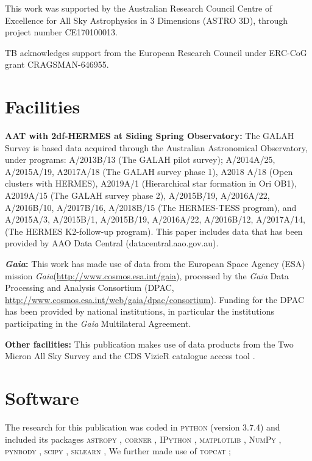 \documentclass[fleqn,usenatbib]{mnras}
\newcommand{\Gaia}{\textit{Gaia}\xspace} %
\begin{document}
This work was supported by the Australian Research Council Centre of Excellence for All Sky Astrophysics in 3 Dimensions (ASTRO 3D), through project number CE170100013.

TB acknowledges support from the European Research Council under ERC-CoG grant CRAGSMAN-646955.

\section*{Facilities}

\textbf{AAT with 2df-HERMES at Siding Spring Observatory:}
The GALAH Survey is based data acquired through the Australian Astronomical Observatory, under programs: A/2013B/13 (The GALAH pilot survey); A/2014A/25, A/2015A/19, A2017A/18 (The GALAH survey phase 1), A2018 A/18 (Open clusters with HERMES), A2019A/1 (Hierarchical star formation in Ori OB1), A2019A/15 (The GALAH survey phase 2), A/2015B/19, A/2016A/22, A/2016B/10, A/2017B/16, A/2018B/15 (The HERMES-TESS program), and A/2015A/3, A/2015B/1, A/2015B/19, A/2016A/22, A/2016B/12, A/2017A/14, (The HERMES K2-follow-up program). This paper includes data that has been provided by AAO Data Central (datacentral.aao.gov.au).

\textbf{\Gaia: } This work has made use of data from the European Space Agency (ESA) mission \Gaia (\url{http://www.cosmos.esa.int/gaia}), processed by the \Gaia Data Processing and Analysis Consortium (DPAC, \url{http://www.cosmos.esa.int/web/gaia/dpac/consortium}). Funding for the DPAC has been provided by national institutions, in particular the institutions participating in the \Gaia Multilateral Agreement. 

\textbf{Other facilities:} This publication makes use of data products from the Two Micron All Sky Survey \citep{Skrutskie2006} and the CDS VizieR catalogue access tool \citep{Vizier2000}.

\section*{Software}

The research for this publication was coded in \textsc{python} (version 3.7.4) and included its packages
\textsc{astropy} \citep[v. 3.2.2;][]{Robitaille2013,PriceWhelan2018},
\textsc{corner} \citep[v. 2.0.1;][]{corner},
\textsc{IPython} \citep[v. 7.8.0;][]{ipython},
\textsc{matplotlib} \citep[v. 3.1.3;][]{matplotlib},
\textsc{NumPy} \citep[v. 1.17.2;][]{numpy},
\textsc{pynbody} \citep[v. 1.1.0;][]{pynbody},
\textsc{scipy} \citep[version 1.3.1;][]{scipy},
\textsc{sklearn} \citep[v. 0.21.3;][]{scikit-learn},
We further made use of \textsc{topcat} \citep[version 4.7;][]{Taylor2005};
\end{document}
